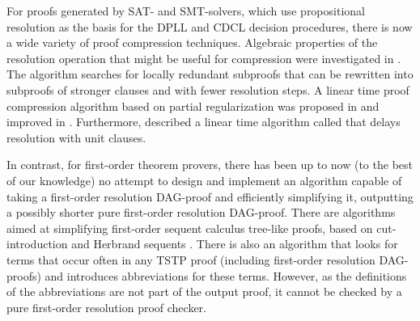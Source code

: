 \documentclass{llncs}
\begin{document}
For proofs generated by SAT- and SMT-solvers, which use propositional resolution as the basis for the DPLL and CDCL decision procedures, there is now a wide variety of proof compression techniques. Algebraic properties of the resolution
operation that might be useful for compression were investigated in \cite{bwp10}.
The {\ReduceReconstruct} algorithm \cite{RedRec} searches for locally redundant
subproofs that can be rewritten into subproofs of stronger clauses and with fewer resolution steps.
A linear time proof compression algorithm based on partial
regularization was proposed in \cite{RP08} and improved in \cite{LURPI}. Furthermore, \cite{LURPI} described a linear time algorithm called {\LowerUnits} that delays resolution with unit clauses.

In contrast, for first-order theorem provers, there has been up to now (to the best of our knowledge) no attempt to design and implement an algorithm capable of taking a first-order resolution DAG-proof and efficiently simplifying it, outputting a possibly shorter pure first-order resolution DAG-proof. There are algorithms aimed at simplifying first-order sequent calculus tree-like proofs, based on cut-introduction and Herbrand sequents \cite{BrunoLPAR,Hetzl,HerbrandSequent}.
There is also an algorithm \cite{LPARCzech} that looks for terms that occur often in any TSTP \cite{TPTP} proof (including first-order resolution DAG-proofs) and introduces abbreviations for these terms. However, as the definitions of the abbreviations are not part of the output proof, it cannot be checked by a pure first-order resolution proof checker.
\end{document}

